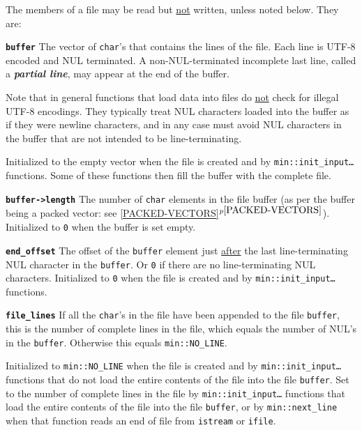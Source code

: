 \documentclass[12pt]{article}
\makeatletter
\newcommand{\key}[1]{{\bf \em #1}\index{#1}}
\newcommand{\ttmkey}[2]{{\tt \bf #1}\index{#1@{\tt #1}!#2}}
\newcommand{\itemref}[1]{\ref{#1}$^{p\pageref{#1}}$}
\newcommand{\EOL}{\penalty \exhyphenpenalty}
\newcommand{\GT}{{\tt >}}
\newenvironment{itemlist}[1][1.2in]%
	{\begin{list}{}{\setlength{\labelwidth}{#1}%
		        \setlength{\leftmargin}{\labelwidth}%
		        \addtolength{\leftmargin}{+0.2in}%
		        \renewcommand{\makelabel}[1]{##1\hfill}}}%
	{\end{list}}
\makeatother
\begin{document}
The members of a file may be read but \underline{not} written, unless
noted below.  They are:

\begin{itemlist}[1.4in]

\item[\ttmkey{buffer}{in {\tt min::file}}]
The vector of {\tt char}'s that contains the lines of the file.  Each
line is UTF-8 encoded and NUL terminated.  A non-NUL-terminated incomplete
last line, called a \key{partial line}, may appear at the end of the buffer.

Note that in general functions that load data into files do \underline{not}
check for illegal UTF-8 encodings.  They typically treat NUL characters
loaded into the buffer as if they were newline characters, and in any
case must avoid NUL characters in the buffer that are not intended
to be line-terminating.

Initialized to the empty vector when the file is created and by
{\tt min::\EOL init\_\EOL input\ldots} functions.
Some of these functions then fill the buffer with the complete file.

\item[\ttmkey{buffer-\GT length}{in {\tt min::file}}]
The number of {\tt char} elements in the file buffer
(as per the buffer being a packed vector: see \itemref{PACKED-VECTORS}).
Initialized to {\tt 0} when the buffer is set empty.

\item[\ttmkey{end\_\EOL offset}{in {\tt min::file}}]
The offset of the {\tt buffer} element just \underline{after} the last
line-terminating NUL character in the {\tt buffer}.  Or {\tt 0} if there
are no line-terminating NUL characters.
Initialized to {\tt 0} when the file is created and by
{\tt min::\EOL init\_\EOL input\ldots} functions.

\item[\ttmkey{file\_\EOL lines}{in {\tt min::file}}]
If all the {\tt char}'s in the file have been appended to the file {\tt buffer},
this is the number of complete lines in the file, which equals
the number of NUL's in the {\tt buffer}.  Otherwise this equals
{\tt min::\EOL NO\_\EOL LINE}.

Initialized to {\tt min::\EOL NO\_\EOL LINE} when the file is created and by
{\tt min::\EOL init\_\EOL input\ldots} functions that do not load
the entire contents of the file into the file {\tt buffer}.
Set to the number of complete lines in the file
by {\tt min::\EOL init\_\EOL input\ldots} functions that load
the entire contents of the file into the file {\tt buffer}, or
by {\tt min::\EOL next\_\EOL line} when that function
reads an end of file from {\tt istream} or {\tt ifile}.


\end{itemlist}
\end{document}
